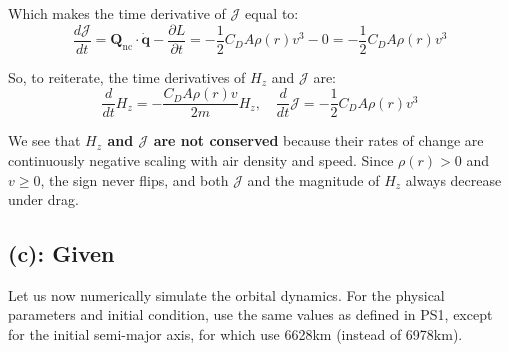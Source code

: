 \documentclass[titlepage]{article}
\begin{document}
Which makes the time derivative of $\mathcal{J}$ equal to:
\begin{equation}
	\frac{d\mathcal{J}}{dt}=\boldsymbol{Q}_{\text{nc}}\cdot\dot{\boldsymbol{q}}-\frac{\partial L}{\partial t}=-\frac{1}{2}C_DA\rho(r)v^3-0=-\frac{1}{2}C_DA\rho(r)v^3
\end{equation}

\begin{mdframed}[linewidth=1pt, innertopmargin=10pt, innerbottommargin=10pt]
	So, to reiterate, the time derivatives of $H_z$ and $\mathcal{J}$ are:
	\begin{equation}
		\frac{d}{dt}H_z=-\frac{C_DA\rho(r)v}{2m}H_z,\quad\frac{d}{dt}\mathcal{J}=-\frac{1}{2}C_DA\rho(r)v^3
	\end{equation}
	
	We see that \textbf{$H_z$ and $\mathcal{J}$ are not conserved} because their rates of change are continuously negative scaling with air density and speed. Since $\rho(r)>0$ and $v\geq0$, the sign never flips, and both $\mathcal{J}$ and the magnitude of $H_z$ always decrease under drag.
\end{mdframed}

\newpage

\subsection*{(c): Given}

Let us now numerically simulate the orbital dynamics. For the physical parameters and initial condition, use the same values as defined in PS1, except for the initial semi-major axis, for which use 6628km (instead of 6978km).\\

\begin{table}[H]
	\centering
	\caption{Reference orbit}
	\label{tab:reference_orbit}
\end{table}
\end{document}
